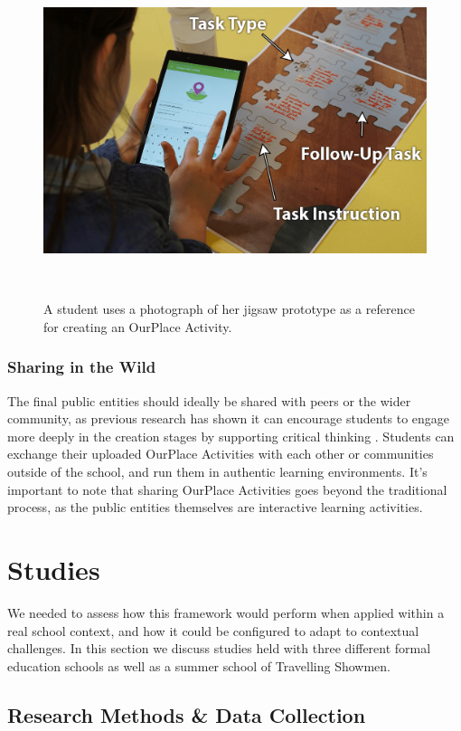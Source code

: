 \documentclass[,hyphens]{sigchi}
\begin{document}
\begin{figure}
\centering
  \includegraphics[width=1\columnwidth]{figures/jigsawToApp}
  \caption{A student uses a photograph of her jigsaw prototype as a reference for creating an OurPlace Activity.}~\label{fig:JigsawToApp}
  \vspace{-2em}
\end{figure}

\subsubsection{Sharing in the Wild}
The final public entities should ideally be shared with peers or the wider community, as previous research has shown it can encourage students to engage more deeply in the creation stages by supporting critical thinking \cite{Sarangapani2018}. Students can exchange their uploaded OurPlace Activities with each other or communities outside of the school, and run them in authentic learning environments. It's important to note that sharing OurPlace Activities goes beyond the traditional process, as the public entities themselves are interactive learning activities.

\section{Studies}
We needed to assess how this framework would perform when applied within a real school context, and how it could be configured to adapt to contextual challenges. In this section we discuss studies held with three different formal education schools as well as a summer school of Travelling Showmen.

\subsection{Research Methods \& Data Collection}
\end{document}
